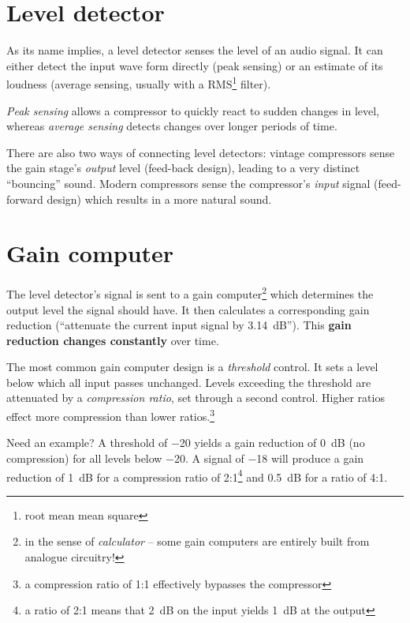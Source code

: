 \section{Level detector}
\label{sec:level_detector}

As its name implies, a level detector senses the level of an audio
signal.  It can either detect the input wave form directly (peak
sensing) or an estimate of its loudness (average sensing, usually with
a RMS\footnote{root mean mean square} filter).

\emph{Peak sensing} allows a compressor to quickly react to sudden
changes in level, whereas \emph{average sensing} detects changes over
longer periods of time.

There are also two ways of connecting level detectors: vintage
compressors sense the gain stage's \emph{output} level (feed-back
design), leading to a very distinct ``bouncing'' sound.  Modern
compressors sense the compressor's \emph{input} signal (feed-forward
design) which results in a more natural sound.

\section{Gain computer}
\label{sec:gain_computer}

The level detector's signal is sent to a gain computer\footnote{in the
  sense of \emph{calculator} -- some gain computers are entirely built
  from analogue circuitry!} which determines the output level the
signal should have.  It then calculates a corresponding gain reduction
(``attenuate the current input signal by \SI{3.14}{\dB}'').  This
\textbf{gain reduction changes constantly} over time.

The most common gain computer design is a \emph{threshold} control.
It sets a level below which all input passes unchanged.  Levels
exceeding the threshold are attenuated by a \emph{compression ratio},
set through a second control.  Higher ratios effect more compression
than lower ratios.\footnote{a compression ratio of 1:1 effectively
  bypasses the compressor}

Need an example?  A threshold of \SI{-20}{\dBFS} yields a gain
reduction of \SI{0}{\dB} (no compression) for all levels below
\SI{-20}{\dBFS}.  A signal of \SI{-18}{\dBFS} will produce a gain
reduction of \SI{1}{\dB} for a compression ratio of 2:1\footnote{a
  ratio of 2:1 means that \SI{2}{\dB} on the input yields \SI{1}{\dB}
  at the output} and \SI{0.5}{\dB} for a ratio of 4:1.

